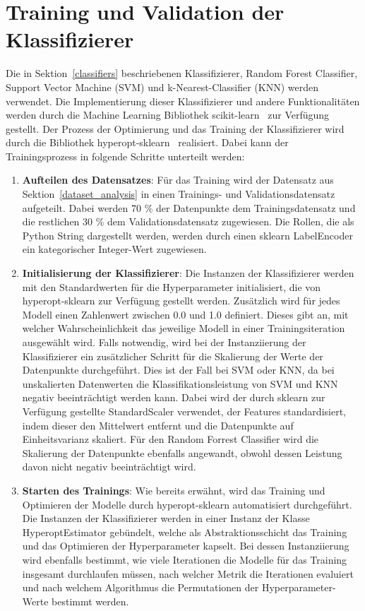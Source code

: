 \section{Training und Validation der Klassifizierer}

Die in Sektion~\ref{classifiers} beschriebenen Klassifizierer, Random Forest Classifier, Support Vector Machine (SVM) und k-Nearest-Classifier (KNN) werden verwendet.
Die Implementierung dieser Klassifizierer und andere Funktionalitäten werden durch die Machine Learning Bibliothek scikit-learn~\cite{scikit-learn} zur Verfügung gestellt.
Der Prozess der Optimierung und das Training der Klassifizierer wird durch die Bibliothek hyperopt-sklearn~\cite{Komer2019} realisiert. 
Dabei kann der Trainingsprozess in folgende Schritte unterteilt werden:

\begin{enumerate}
    \item \textbf{Aufteilen des Datensatzes}: Für das Training wird der Datensatz aus Sektion~\ref{dataset_analysis} in einen Trainings- und Validationsdatensatz aufgeteilt. Dabei werden 70 \% der Datenpunkte dem Trainingsdatensatz und die restlichen 30 \% dem Validationsdatensatz zugewiesen. Die Rollen, die als Python String dargestellt werden, werden durch einen sklearn LabelEncoder ein kategorischer Integer-Wert zugewiesen. 
    \item \textbf{Initialisierung der Klassifizierer}: Die Instanzen der Klassifizierer werden mit den Standardwerten für die Hyperparameter initialisiert, die von hyperopt-sklearn zur Verfügung gestellt werden.
    Zusätzlich wird für jedes Modell einen Zahlenwert zwischen 0.0 und 1.0 definiert. Dieses gibt an, mit welcher Wahrscheinlichkeit das jeweilige Modell in einer Trainingsiteration ausgewählt wird. Falls notwendig, wird bei der Instanziierung der Klassifizierer ein zusätzlicher Schritt für die Skalierung der Werte der Datenpunkte durchgeführt.
    Dies ist der Fall bei SVM oder KNN, da bei unskalierten Datenwerten die Klassifikationsleistung von SVM und KNN negativ beeinträchtigt werden kann. Dabei wird der durch sklearn zur Verfügung gestellte StandardScaler verwendet, der Features standardisiert, indem dieser den Mittelwert entfernt und die Datenpunkte auf Einheitsvarianz skaliert. Für den Random Forrest Classifier wird die Skalierung der Datenpunkte ebenfalls angewandt, obwohl dessen Leistung davon nicht negativ beeinträchtigt wird.
    \item \textbf{Starten des Trainings}: Wie bereits erwähnt, wird das Training und Optimieren der Modelle durch hyperopt-sklearn automatisiert durchgeführt. Die Instanzen der Klassifizierer werden in einer Instanz der Klasse HyperoptEstimator gebündelt, welche als Abstraktionsschicht das Training und das Optimieren der Hyperparameter kapselt. Bei dessen Instanziierung wird ebenfalls bestimmt, wie viele Iterationen die Modelle für das Training insgesamt durchlaufen müssen, nach welcher Metrik die Iterationen evaluiert und nach welchem Algorithmus die Permutationen der Hyperparameter-Werte bestimmt werden. 

\end{enumerate}
